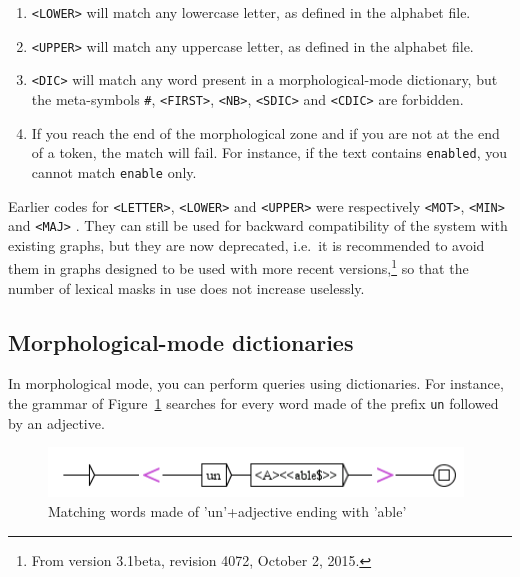 \begin{enumerate}
    \item \verb+<LOWER>+ will match any lowercase letter, as defined in the
    alphabet file.

    \item \verb+<UPPER>+ will match any uppercase letter, as defined in the
    alphabet file.

    \item \verb+<DIC>+ will match any word present in a morphological-mode
    dictionary, but the meta-symbols \verb+#+, \verb+<FIRST>+, \verb+<NB>+, 
    \verb+<SDIC>+ and \verb+<CDIC>+ are forbidden.\index{\verb+#+}     

    \item If you reach the end of the morphological zone and if you are not
    at the end of a token, the match will fail. For instance, if the text
    contains \verb+enabled+, you cannot match \verb+enable+ only.
\end{enumerate}

\noindent Earlier codes for \verb+<LETTER>+, \verb+<LOWER>+ and \verb+<UPPER>+
were respectively \verb+<MOT>+, \verb+<MIN>+ and \verb+<MAJ>+ .
They can still be used for backward compatibility of the system with existing graphs,
but they are now deprecated, i.e.\ it is recommended to avoid them in graphs designed to be used with
more recent versions,\footnote{From version 3.1beta, revision 4072, October 2, 2015.}
so that the number of lexical masks in use does not increase uselessly.

\subsection{Morphological-mode dictionaries}
\label{morph-mode-dic}
In morphological mode, you can perform queries using dictionaries. For instance,  the grammar
of Figure~\ref{fig-morpho3} searches for every word made of the prefix \verb+un+ followed
by an adjective.

\begin{figure}[!ht]
\begin{center}
\includegraphics[width=11cm]{resources/img/fig6-17m.png}
\caption{Matching words made of 'un'+adjective ending with
'able'\label{fig-morpho3}}
\end{center}
\end{figure}

